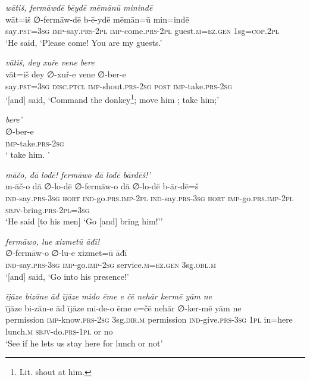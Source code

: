 \ea \label{HB.51}
\textit{wātiš, fermāwdē bēydē mēmānū minindē} \\ 
\gll wāt=iš ∅-fermāw-dē b-ē-ydē mēmān=ū min=indē \\ 
 say\textsc{.pst}\textsc{=3sg} \textsc{imp-}say\textsc{.prs}\textsc{-2pl} \textsc{imp-}come\textsc{.prs}\textsc{-2pl} guest\textsc{.m}\textsc{=ez}\textsc{.gen} 1sg\textsc{=cop}\textsc{.2pl} \\ 
\glt `He said, ‘Please come! You are my guests.'
\z 
 
\ea \label{HB.62}
\textit{vātiš, dey xuře vene bere} \\ 
\gll vāt=iš dey ∅-xuř-e vene ∅-ber-e \\ 
 say\textsc{.pst}\textsc{=3sg} \textsc{disc.ptcl} \textsc{imp-}shout\textsc{.prs}-\textsc{2sg} \textsc{post} \textsc{imp-}take\textsc{.prs}-\textsc{2sg} \\ 
\glt `[and] said, ‘Command the donkey\footnote{Lit. shout at him.}; move him ; take him;'
\z 
 
\ea \label{HB.63}
\textit{bere’} \\ 
\gll ∅-ber-e \\ 
 \textsc{imp-}take\textsc{.prs}-\textsc{2sg} \\ 
\glt ` take him. '
\z 
 
\ea \label{HB.79}
\textit{māčo, dā lodē! fermāwo dā lodē bārdēš!’} \\ 
\gll m-āč-o dā ∅-lo-dē ∅-fermāw-o dā ∅-lo-dē b-ār-dē=š \\ 
 \textsc{ind-}say\textsc{.prs}\textsc{-3sg} \textsc{hort} \textsc{ind-}go\textsc{.prs}\textsc{.imp}\textsc{-2pl} \textsc{ind-}say\textsc{.prs}\textsc{-3sg} \textsc{hort} \textsc{imp-}go\textsc{.prs}\textsc{.imp}\textsc{-2pl} \textsc{sbjv-}bring\textsc{.prs}\textsc{-2pl}\textsc{=3sg} \\ 
\glt `He said [to his men] ‘Go [and] bring him!’'
\z 
 
\ea \label{PM.8}
\textit{fermāwo, lue xizmetū āđī!} \\ 
\gll ∅-fermāw-o ∅-lu-e xizmet=ū āđī \\ 
 \textsc{ind-}say\textsc{.prs}\textsc{-3sg} \textsc{imp-}go.\textsc{imp-}\textsc{2sg} service\textsc{.m}\textsc{\textsc{=ez.gen}} 3sg\textsc{.obl}\textsc{.m} \\ 
\glt `[and] said, ‘Go into his presence!'
\z 
 
\ea \label{PM.9}
\textit{ījāze bizāne āđ ījāze miđo ēme e čē nehār kermē yām ne} \\ 
\gll ījāze bi-zān-e āđ ījāze mi-đe-o ēme e=čē nehār ∅-ker-mē yām ne \\ 
 permission \textsc{imp-}know\textsc{.prs}-\textsc{2sg} 3sg\textsc{.dir}\textsc{.m} permission \textsc{ind-}give\textsc{.prs}\textsc{-3sg} \textsc{1pl} in=here lunch\textsc{.m} \textsc{sbjv-}do\textsc{.prs}\textsc{-1pl} or no \\ 
\glt `See if he lets us stay here for lunch or not'
\z 
 
